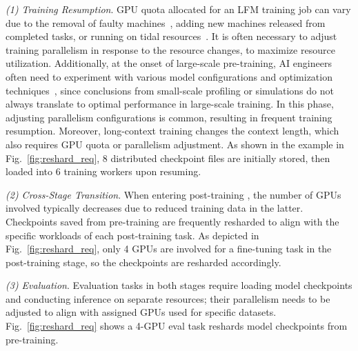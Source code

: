 \noindent \textit{(1) Training Resumption}.
GPU quota allocated for an LFM training job can vary due to the removal of faulty machines~\cite{megascale, characterization}, adding new machines released from completed tasks, or running on tidal resources~\cite{parcae, qsync, lyra, antman}.
It is often necessary to adjust training parallelism in response to the resource changes, to maximize resource utilization.
Additionally, at the onset of large-scale pre-training, AI engineers often need to experiment with various model configurations and %
optimization techniques~\cite{megascale}, since conclusions from small-scale profiling or simulations do not always translate to optimal performance in large-scale training.
In this phase, adjusting parallelism configurations is common, resulting in frequent training resumption.
Moreover, long-context training changes the context length, which also requires GPU quota or parallelism adjustment.
As shown in the example in Fig.~\ref{fig:reshard_req}, 8 distributed checkpoint files are initially stored, then loaded into 6 training workers upon resuming.

\noindent \textit{(2) Cross-Stage Transition}.
When entering 
post-training 
, the number of GPUs involved typically decreases due to reduced training data in the latter.
Checkpoints saved from pre-training are frequently resharded to align with the specific workloads of each post-training task.
As depicted in Fig.~\ref{fig:reshard_req}, only 4 GPUs are involved for a fine-tuning task in the post-training stage, so the checkpoints are resharded accordingly.

\noindent \textit{(3) Evaluation}.
Evaluation tasks in both stages require loading model checkpoints and conducting inference on separate resources;
their parallelism needs to be adjusted to align with assigned GPUs used for specific datasets.
Fig.~\ref{fig:reshard_req} shows a 4-GPU eval task reshards model checkpoints from pre-training.

